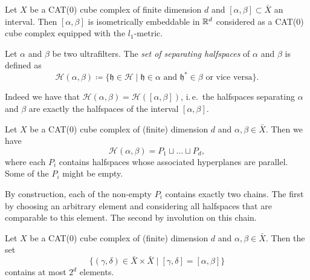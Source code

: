 \begin{thm}
  \label{thm:interval}
  Let \(X\) be a CAT(0) cube complex of finite dimension \(d\) and \([\alpha,\beta] \subset \bar X\) an interval. Then \([\alpha,\beta]\) is isometrically embeddable in \(\mathbb{R}^d\) considered as a CAT(0) cube complex equipped with the \(l_1\)-metric.
\end{thm}

\begin{defin}
  \label{defin:separating}
  Let \(\alpha\) and \(\beta\) be two ultrafilters. The \emph{set of separating halfspaces} of \(\alpha\) and \(\beta\) is defined as
  \[
    \mathcal{H}(\alpha,\beta) \coloneqq \{\mathfrak{h} \in \mathcal{H} \mid \mathfrak{h} \in \alpha \text{ and } \mathfrak{h}^\ast \in \beta \text{ or vice versa}\}.
  \]
\end{defin}

\begin{rem}
  \label{rem:interval}
  Indeed we have that \(\mathcal{H}(\alpha,\beta) = \mathcal{H}([\alpha,\beta])\), i.\,e.\ the halfspaces separating \(\alpha\) and \(\beta\) are exactly the halfspaces of the interval \([\alpha,\beta]\).
\end{rem}

\begin{lemma}
  \label{lem:b-1.16}
  Let \(X\) be a CAT(0) cube complex of (finite) dimension \(d\) and \(\alpha, \beta \in \bar X\). Then we have
  \[
    \mathcal{H}(\alpha, \beta) = P_1 \sqcup \dots \sqcup P_d,
  \]
  where each \(P_i\) contains halfspaces whose associated hyperplanes are parallel. Some of the \(P_i\) might be empty.
\end{lemma}

\begin{rem}
  \label{rem:b-1.16}
  By construction, each of the non-empty \(P_i\) contains exactly two chains. The first by choosing an arbitrary element and considering all halfspaces that are comparable to this element. The second by involution on this chain.
\end{rem}

\begin{cor}
  \label{cor:finite-interval}
  Let \(X\) be a CAT(0) cube complex of (finite) dimension \(d\) and \(\alpha, \beta \in \bar X\). Then the set
  \[
    \{(\gamma, \delta) \in \bar X \times \bar X \mid [\gamma, \delta] = [\alpha, \beta]\}
  \]
  contains at most \(2^d\) elements.
\end{cor}

